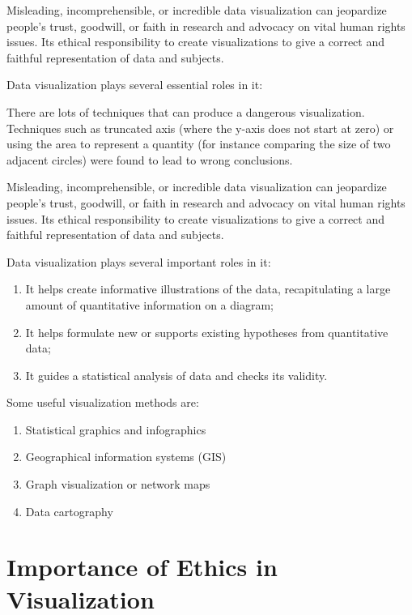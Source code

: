 \documentclass[]{book}
\providecommand{\tightlist}{%
  \setlength{\itemsep}{0pt}\setlength{\parskip}{0pt}}
\theoremstyle{definition}
\theoremstyle{definition}
\theoremstyle{definition}
\theoremstyle{remark}
\begin{document}
Misleading, incomprehensible, or incredible data visualization can
jeopardize people's trust, goodwill, or faith in research and advocacy
on vital human rights issues. Its ethical responsibility to create
visualizations to give a correct and faithful representation of data and
subjects.

Data visualization plays several essential roles in it:

There are lots of techniques that can produce a dangerous visualization.
Techniques such as truncated axis (where the y-axis does not start at
zero) or using the area to represent a quantity (for instance comparing
the size of two adjacent circles) were found to lead to wrong
conclusions.

Misleading, incomprehensible, or incredible data visualization can
jeopardize people's trust, goodwill, or faith in research and advocacy
on vital human rights issues. Its ethical responsibility to create
visualizations to give a correct and faithful representation of data and
subjects.

Data visualization plays several important roles in it:

\begin{enumerate}
\def\labelenumi{\arabic{enumi}.}
\tightlist
\item
  It helps create informative illustrations of the data, recapitulating
  a large amount of quantitative information on a diagram;
\item
  It helps formulate new or supports existing hypotheses from
  quantitative data;
\item
  It guides a statistical analysis of data and checks its validity.
\end{enumerate}

Some useful visualization methods are:

\begin{enumerate}
\def\labelenumi{\arabic{enumi}.}
\tightlist
\item
  Statistical graphics and infographics
\item
  Geographical information systems (GIS)
\item
  Graph visualization or network maps
\item
  Data cartography
\end{enumerate}

\section{Importance of Ethics in
Visualization}\label{importance-of-ethics-in-visualization}
\end{document}
